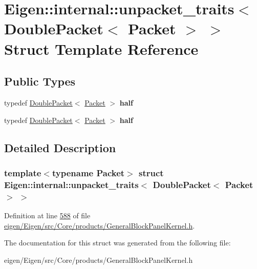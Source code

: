 \hypertarget{struct_eigen_1_1internal_1_1unpacket__traits_3_01_double_packet_3_01_packet_01_4_01_4}{}\section{Eigen\+:\+:internal\+:\+:unpacket\+\_\+traits$<$ Double\+Packet$<$ Packet $>$ $>$ Struct Template Reference}
\label{struct_eigen_1_1internal_1_1unpacket__traits_3_01_double_packet_3_01_packet_01_4_01_4}
\subsection*{Public Types}
\begin{DoxyCompactItemize}
\item 
\mbox{\label{struct_eigen_1_1internal_1_1unpacket__traits_3_01_double_packet_3_01_packet_01_4_01_4_adb8d3a8aae0ebb3ed80197eaa11886bb}} 
typedef \hyperlink{struct_eigen_1_1internal_1_1_double_packet}{Double\+Packet}$<$ \hyperlink{union_eigen_1_1internal_1_1_packet}{Packet} $>$ {\bfseries half}
\item 
\mbox{\label{struct_eigen_1_1internal_1_1unpacket__traits_3_01_double_packet_3_01_packet_01_4_01_4_adb8d3a8aae0ebb3ed80197eaa11886bb}} 
typedef \hyperlink{struct_eigen_1_1internal_1_1_double_packet}{Double\+Packet}$<$ \hyperlink{union_eigen_1_1internal_1_1_packet}{Packet} $>$ {\bfseries half}
\end{DoxyCompactItemize}


\subsection{Detailed Description}
\subsubsection*{template$<$typename Packet$>$\newline
struct Eigen\+::internal\+::unpacket\+\_\+traits$<$ Double\+Packet$<$ Packet $>$ $>$}



Definition at line \hyperlink{eigen_2_eigen_2src_2_core_2products_2_general_block_panel_kernel_8h_source_l00588}{588} of file \hyperlink{eigen_2_eigen_2src_2_core_2products_2_general_block_panel_kernel_8h_source}{eigen/\+Eigen/src/\+Core/products/\+General\+Block\+Panel\+Kernel.\+h}.



The documentation for this struct was generated from the following file\+:\begin{DoxyCompactItemize}
\item 
eigen/\+Eigen/src/\+Core/products/\+General\+Block\+Panel\+Kernel.\+h\end{DoxyCompactItemize}
